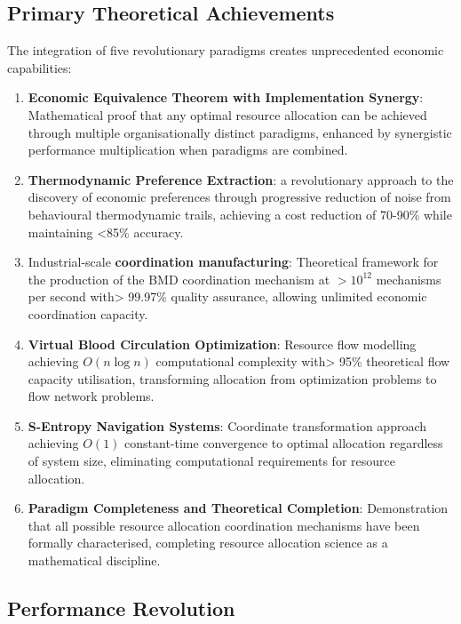 \documentclass[12pt,a4paper]{article}
\begin{document}
\subsection{Primary Theoretical Achievements}

The integration of five revolutionary paradigms creates unprecedented economic capabilities:

\begin{enumerate}
\item \textbf{Economic Equivalence Theorem with Implementation Synergy}: Mathematical proof that any optimal resource allocation can be achieved through multiple organisationally distinct paradigms, enhanced by synergistic performance multiplication when paradigms are combined.

\item \textbf{Thermodynamic Preference Extraction}: a revolutionary approach to the discovery of economic preferences through progressive reduction of noise from behavioural thermodynamic trails, achieving a cost reduction of 70-90\% while maintaining <85\% accuracy.

\item Industrial-scale \textbf{coordination manufacturing}: Theoretical framework for the production of the BMD coordination mechanism at $>10^{12}$ mechanisms per second with> 99.97\% quality assurance, allowing unlimited economic coordination capacity.

\item \textbf{Virtual Blood Circulation Optimization}: Resource flow modelling achieving $O(n \log n)$ computational complexity with> 95\% theoretical flow capacity utilisation, transforming allocation from optimization problems to flow network problems.

\item \textbf{S-Entropy Navigation Systems}: Coordinate transformation approach achieving $O(1)$ constant-time convergence to optimal allocation regardless of system size, eliminating computational requirements for resource allocation.

\item \textbf{Paradigm Completeness and Theoretical Completion}: Demonstration that all possible resource allocation coordination mechanisms have been formally characterised, completing resource allocation science as a mathematical discipline.
\end{enumerate}

\subsection{Performance Revolution}
\end{document}
